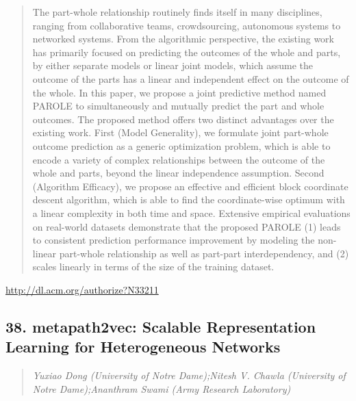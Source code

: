 \documentclass{article}
\begin{document}
\begin{quote}
The part-whole relationship routinely finds itself in many disciplines, ranging from collaborative teams, crowdsourcing, autonomous systems to networked systems. From the algorithmic perspective, the existing work has primarily focused on predicting the outcomes of the whole and parts, by either separate models or linear joint models, which assume the outcome of the parts has a linear and independent effect on the outcome of the whole. In this paper, we propose a joint predictive method named PAROLE to simultaneously and mutually predict the part and whole outcomes. The proposed method offers two distinct advantages over the existing work. First (Model Generality), we formulate joint part-whole outcome prediction as a generic optimization problem, which is able to encode a variety of complex relationships between the outcome of the whole and parts, beyond the linear independence assumption. Second (Algorithm Efficacy), we propose an effective and efficient block coordinate descent algorithm, which is able to find the coordinate-wise optimum with a linear complexity in both time and space. Extensive empirical evaluations on real-world datasets demonstrate that the proposed PAROLE (1) leads to consistent prediction performance improvement by modeling the non-linear part-whole relationship as well as part-part interdependency, and (2) scales linearly in terms of the size of the training dataset.
\end{quote}

\href{http://dl.acm.org/authorize?N33211}{http://dl.acm.org/authorize?N33211}

\subsection{38. metapath2vec: Scalable Representation Learning for Heterogeneous Networks}

\begin{quote}
\footnotesize{\textit{Yuxiao Dong (University of Notre Dame);Nitesh V. Chawla (University of Notre Dame);Ananthram Swami (Army Research Laboratory)}}

\end{quote}
\end{document}
